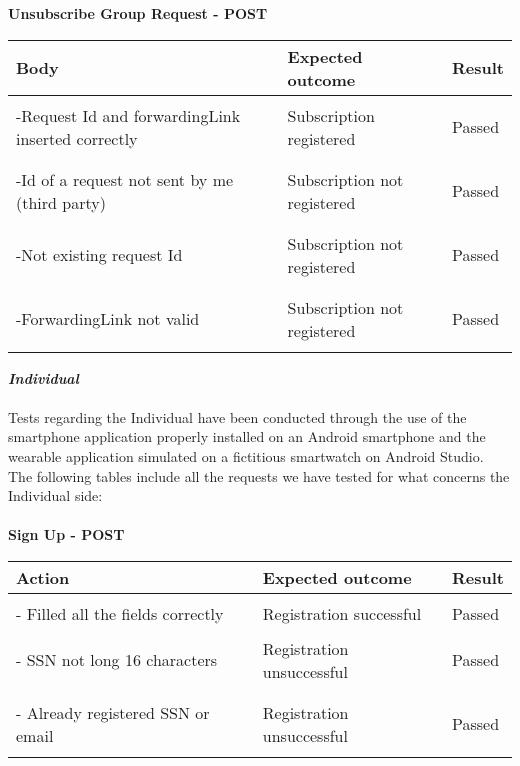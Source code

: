 \textbf{Unsubscribe Group Request - POST}
\begin{center}
	\begin{tabular}{|p{}|p{}|p{}|}
		\hline
		Body & Expected outcome & Result \\
		\hline
		&&\\
		-Request Id and forwardingLink inserted correctly&Subscription registered&Passed\\
		&&\\
		\hline
		&&\\
		-Id of a request not sent by me (third party)&Subscription not registered&Passed\\
		&&\\
		\hline
		&&\\
		-Not existing request Id &Subscription not registered&Passed\\
		&&\\
		\hline
		&&\\
		-ForwardingLink not valid &Subscription not registered&Passed\\
		&&\\
		\hline
	\end{tabular}
\end{center}

\textbf{\textit{Individual}}\\\\
Tests regarding the Individual have been conducted through the use of the smartphone application properly installed on an Android smartphone and the wearable application simulated on a fictitious smartwatch on Android Studio.\\ 
The following tables include all the requests we have tested for what concerns the Individual side:\\\\

\textbf{Sign Up - POST}
\begin{center}
	\begin{tabular}{|p{}|p{}|p{}|}
		\hline
		Action & Expected outcome & Result \\
		\hline
		&&\\
		- Filled all the fields correctly&Registration successful&Passed\\
		\hline
		&&\\
		- SSN not long 16 characters&Registration unsuccessful&Passed\\
		&&\\
		\hline
		&&\\
		- Already registered SSN or email&Registration unsuccessful&Passed\\
		&&\\
		\hline
	\end{tabular}
\end{center}


